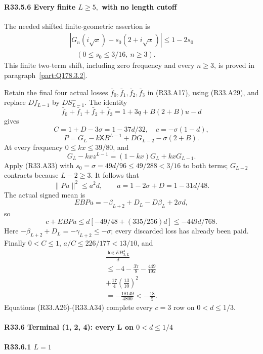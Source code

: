 \paragraph{R33.5.6 Every finite \(L\ge 5,\allowbreak \) with no length cutoff}

The needed shifted finite-geometric assertion is
\[
\begin{gathered}
|G_n(i\sqrt x)-s_0(2+i\sqrt x)|\le1-2s_0\\
\quad(0\le s_0\le3/16,\ n\ge3).
\end{gathered}\tag{R33.A33}
\]
This finite two-term shift, including zero frequency and every
\(n\ge3\), is proved in paragraph~\ref{part:Q178.3.2}.

Retain the final four actual losses \(\bar f_0,\allowbreak \allowbreak  \bar f_1,\allowbreak \allowbreak  \bar f_2,\allowbreak \allowbreak  \bar f_3\) in (R33.A17),
using (R33.A29), and replace \(D\bar f_{L-1}\) by \(DS^-_{L-1}\).
The identity
\[
\bar f_0+\bar f_1+\bar f_2+\bar f_3=1+3q+B(2+B)u-d
\]
gives
\[
C=1+D-3\sigma=1-37d/32,\quad c=-\sigma(1-d),
\]
\[
P=G_L-k\mathsf XB^{L-1}+DG_{L-2}-\sigma(2+B).
\]
At every frequency \(0\le kx\le39/80\), and
\[
G_L-kxz^{L-1}=(1-kx)G_L+kxG_{L-1}.
\]
Apply (R33.A33) with \(s_0=\sigma=49d/96\le49/288<3/16\)
to both terms; \(G_{L-2}\) contracts because \(L-2\ge3\).
It follows that
\[
\|Pu\|^2\le a^2d,\qquad a=1-2\sigma+D=1-31d/48.
\]
The actual signed mean is
\[
EBPu=-\beta_{L+2}+D_L-D\beta_L+2\sigma d,
\]
so
\[
c+EBPu
\le d[-49/48+(335/256)d]\le-449d/768.
\]
Here \(-\beta_{L+2}+D_L=-\gamma_{L+2}\le-\sigma\);
every discarded loss has already been paid.
Finally \(0<C\le1\), \(a/C\le226/177<13/10\), and
\[
\begin{gathered}
\frac{\log EH_{3,L}^4}{d}\\
\le-4-\frac{37}{8}-\frac{449}{192}\\
+\frac{17}{4}\left(\frac{13}{10}\right)^2\\
=-\frac{18149}{4800}<-\frac{18}{5}.
\end{gathered}\tag{R33.A34}
\]
Equations (R33.A26)-(R33.A34) complete every \(c=3\) row on \(0<d\le1/3\).

\paragraph{R33.6 Terminal (1, 2, 4): every L on \(0<d\le 1/4\)}

\paragraph{R33.6.1 \(L=1\)}

